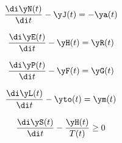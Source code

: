 \begin{equation*}
      \frac{\di\yN(t)}{\di t}- \yJ(t) = -\ya(t)
\end{equation*}

\begin{equation*}
      \frac{\di\yE(t)}{\di t}- \yH(t) = \yR(t)
\end{equation*}

\begin{equation*}
      \frac{\di\yP(t)}{\di t}- \yF(t) = \yG(t)
\end{equation*}

\begin{equation*}
      \frac{\di\yL(t)}{\di t}- \yto(t) = \ym(t)
\end{equation*}



\begin{equation*}
      \frac{\di\yS(t)}{\di t}- \frac{\yH(t)}{T(t)} \ge 0
\end{equation*}

\fi









